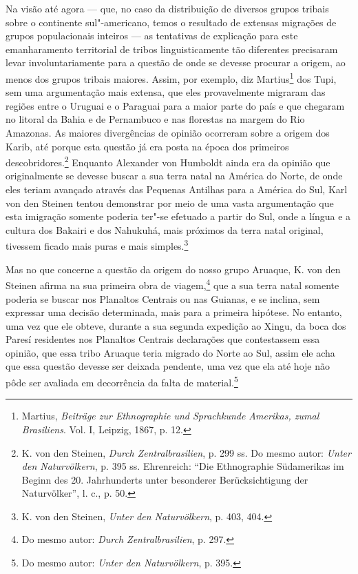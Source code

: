 Na visão até agora --- que, no caso da distribuição de diversos grupos
tribais sobre o continente sul"-americano, temos o resultado de extensas
migrações de grupos populacionais inteiros --- as tentativas de
explicação para este emanharamento territorial de tribos
linguisticamente tão diferentes precisaram levar involuntariamente para
a questão de onde se devesse procurar a origem, ao menos dos grupos
tribais maiores. Assim, por exemplo, diz Martius\footnote{Martius,
  \emph{Beiträge zur Ethnographie und Sprachkunde Amerikas, zumal
  Brasiliens}. Vol. I, Leipzig, 1867, p. 12.} dos Tupi, sem uma
argumentação mais extensa, que eles provavelmente migraram das regiões
entre o Uruguai e o Paraguai para a maior parte do país e que chegaram
no litoral da Bahia e de Pernambuco e nas florestas na margem do Rio
Amazonas. As maiores divergências de opinião ocorreram sobre a origem
dos Karib, até porque esta questão já era posta na época dos primeiros
descobridores.\footnote{K. von den Steinen, \emph{Durch
  Zentralbrasilien}, p. 299 ss. Do mesmo autor: \emph{Unter den
  Naturvölkern}, p. 395 ss. Ehrenreich: ``Die Ethnographie Südamerikas
  im Beginn des 20. Jahrhunderts unter besonderer Berücksichtigung der
  Naturvölker'', l. c., p. 50.} Enquanto Alexander von Humboldt ainda
era da opinião que originalmente se devesse buscar a sua terra natal na
América do Norte, de onde eles teriam avançado através das Pequenas
Antilhas para a América do Sul, Karl von den Steinen tentou demonstrar
por meio de uma vasta argumentação que esta imigração somente poderia
ter"-se efetuado a partir do Sul, onde a língua e a cultura dos Bakairi e
dos Nahukuhá, mais próximos da terra natal original, tivessem ficado
mais puras e mais simples.\footnote{K. von den Steinen, \emph{Unter den
  Naturvölkern}, p. 403, 404.}

Mas no que concerne a questão da origem do nosso grupo Aruaque, K. von
den Steinen afirma na sua primeira obra de viagem,\footnote{Do mesmo
  autor: \emph{Durch Zentralbrasilien}, p. 297.} que a sua terra natal
somente poderia se buscar nos Planaltos Centrais ou nas Guianas, e se
inclina, sem expressar uma decisão determinada, mais para a primeira
hipótese. No entanto, uma vez que ele obteve, durante a sua segunda
expedição ao Xingu, da boca dos Paresí residentes nos Planaltos
Centrais declarações que contestassem essa opinião, que essa tribo
Aruaque teria migrado do Norte ao Sul, assim ele acha que essa questão
devesse ser deixada pendente, uma vez que ela até hoje não pôde ser
avaliada em decorrência da falta de material.\footnote{Do mesmo autor:
  \emph{Unter den Naturvölkern}, p. 395.}

